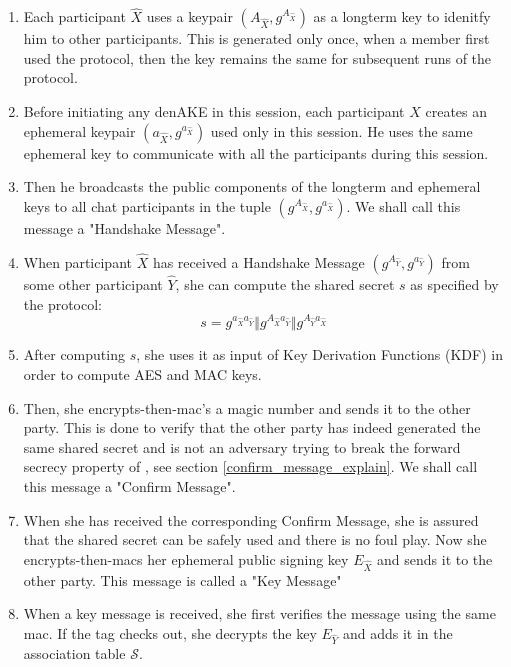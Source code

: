 \begin{enumerate}

  \item Each participant $\hat{X}$ uses a \dhname keypair $(A_{\hat{X}}, g^{A_{\hat{X}}})$ as a longterm key to idenitfy him to other participants. This is generated only once, when a member first used the protocol, then the key remains the same for subsequent runs of the protocol.

  \item Before initiating any denAKE in this session, each participant $\hat{X}$ creates an ephemeral \dhname keypair $(a_{\hat{X}},g^{a_{\hat{X}}})$ used only in this session. He uses the same ephemeral key	to communicate with all the participants during this session.

  \item Then he broadcasts the public components of the longterm and ephemeral keys to all chat participants in the tuple $(g^{A_{\hat{X}}}, g^{a_{\hat{X}}})$. We shall call this message a "Handshake Message".

  \item When participant $\hat{X}$ has received a Handshake Message $(g^{A_{\hat{Y}}}, g^{a_{\hat{Y}}})$ from some other participant $\hat{Y}$, she can compute the shared secret $s$ as specified by the \tdhname protocol:
\[
  s = g^{a_{\hat{X}}a_{\hat{Y}}} \Vert g^{A_{\hat{X}}a_{\hat{Y}}} \Vert g^{A_{\hat{Y}}a_{\hat{X}}}
\]

  \item After computing $s$, she uses it as input of Key Derivation Functions (KDF) in order to compute AES and MAC keys.

  \item Then, she encrypts-then-mac's a magic number and sends it to the other party. This is done to verify that the other party has indeed generated the same shared secret and is not an adversary trying to break the forward secrecy property of \tdhname, see section \ref{confirm_message_explain}. We shall call this message a "Confirm Message".

  \item When she has received the corresponding Confirm Message, she is assured that the shared secret can be safely used and there is no foul play. Now she encrypts-then-macs her ephemeral public signing key $E_{\hat{X}}$ and sends it to the other party. This message is called a "Key Message"

  \item When a key message is received, she first verifies the message using the same mac. If the tag checks out, she decrypts the key $E_{\hat{Y}}$ and adds it in the association table $\mathcal{S}$.

\end{enumerate}

